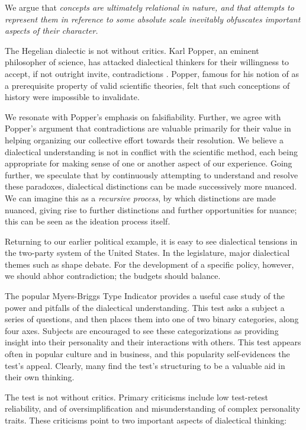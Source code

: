 We argue that \textit{concepts are ultimately relational in nature, and that attempts to represent them in reference to some absolute scale inevitably obfuscates important aspects of their character.}

The Hegelian dialectic is not without critics.
Karl Popper, an eminent philosopher of science, has attacked dialectical thinkers for their willingness to accept, if not outright invite, contradictions \citep{popper}.
Popper, famous for his notion of  as a prerequisite property of valid scientific theories, felt that such conceptions of history were impossible to invalidate.

We resonate with Popper's emphasis on falsifiability.
Further, we agree with Popper's argument that contradictions are valuable primarily for their value in helping organizing our collective effort towards their resolution.
We believe a dialectical understanding is not in conflict with the scientific method, each being appropriate for making sense of one or another aspect of our experience.
Going further, we speculate that by continuously attempting to understand and resolve these paradoxes, dialectical distinctions can be made successively more nuanced.
We can imagine this as a \textit{recursive process}, by which distinctions are made nuanced, giving rise to further distinctions and further opportunities for nuance; this can be seen as the ideation process itself.

\bigskip

Returning to our earlier political example, it is easy to see dialectical tensions in the two-party system of the United States.
In the legislature, major dialectical themes such as  shape debate.
For the development of a specific policy, however, we should abhor contradiction; the budgets should balance.

\bigskip

The popular Myers-Briggs Type Indicator provides a useful case study of the power and pitfalls of the dialectical understanding.
This test asks a subject a series of questions, and then places them into one of two binary categories, along four axes.
Subjects are encouraged to see these categorizations as providing insight into their personality and their interactions with others.
This test appears often in popular culture and in business, and this popularity self-evidences the test's appeal.
Clearly, many find the test's structuring to be a valuable aid in their own thinking.

The test is not without critics.
Primary criticisms include low test-retest reliability, and of oversimplification and misunderstanding of complex personality traits.
These criticisms point to two important aspects of dialectical thinking:

